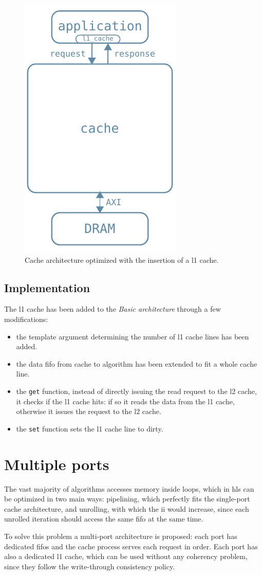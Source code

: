 \documentclass[11pt,a4paper,oneside]{memoir}
\begin{document}
\begin{figure}
	\centering
	\includegraphics[width=.3\textwidth]{l1_arch}
	\caption{Cache architecture optimized with the insertion of a \ac{l1}
	cache.}
	\label{fig:l1_arch}
\end{figure}

\subsection{Implementation}
The \ac{l1} cache has been added to the \emph{Basic architecture} through a few
modifications:
\begin{itemize}
	\item the template argument determining the number of \ac{l1} cache
		lines has been added.
	\item the data \ac{fifo} from cache to algorithm has been extended to
		fit a whole cache line.
	\item the \texttt{get} function, instead of directly issuing the read
		request to the \ac{l2} cache, it checks if the \ac{l1} cache
		hits: if so it reads the data from the \ac{l1} cache, otherwise
		it issues the request to the \ac{l2} cache.
	\item the \texttt{set} function sets the \ac{l1} cache line to dirty.
\end{itemize}

\section{Multiple ports}
The vast majority of algorithms accesses memory inside loops, which in \ac{hls}
can be optimized in two main ways: pipelining, which perfectly fits the
single-port cache architecture, and unrolling, with which the \ac{ii} would
increase, since each unrolled iteration should access the same \ac{fifo} at the
same time.

To solve this problem a multi-port architecture is proposed: each port has
dedicated \acp{fifo} and the cache process serves each request in order.
Each port has also a dedicated \ac{l1} cache, which can be used without any
coherency problem, since they follow the write-through consistency policy.
\end{document}
